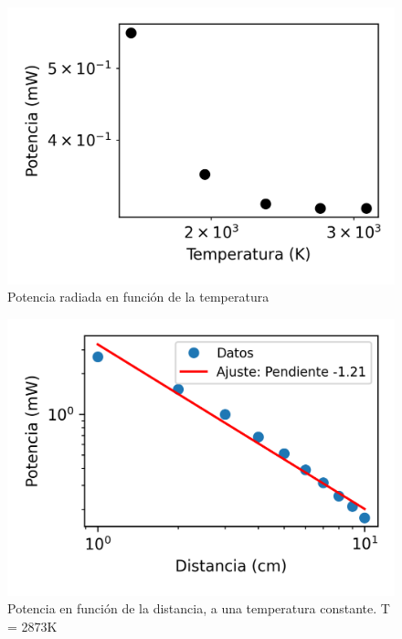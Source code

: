 \begin{figure}
	\begin{center}
		\includegraphics[scale=0.9]{resultados/imagenes/stefan.png}
	\end{center}
	\caption{Potencia radiada en función de la temperatura}
\end{figure}

\begin{figure}
	\begin{center}
		\includegraphics[scale=0.9]{resultados/imagenes/distancia.png}
	\end{center}
	\caption{Potencia en función de la distancia, a una temperatura constante. T = 2873K}
\end{figure}
